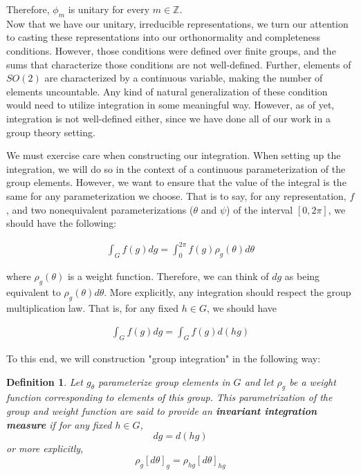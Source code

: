\documentclass[10pt]{ucthesis}
\newcommand{\Z}{\mathbb{Z}}
\newtheorem{definition}{Definition}[chapter]
\begin{document}
Therefore, $\phi_m$ is unitary for every $m\in\Z$. \\

Now that we have our unitary, irreducible representations, we turn our attention to casting these representations into our orthonormality and completeness conditions. However, those conditions were defined over finite groups, and the sums that characterize those conditions are not well-defined. Further, elements of $SO(2)$ are characterized by a continuous variable, making the number of elements uncountable. Any kind of natural generalization of these condition would need to utilize integration in some meaningful way. However, as of yet, integration is not well-defined either, since we have done all of our work in a group theory setting.

We must exercise care when constructing our integration. When setting up the integration, we will do so in the context of a continuous parameterization of the group elements. However, we want to ensure that the value of the integral is the same for any parameterization we choose. That is to say, for any representation, $f$, and two nonequivalent parameterizations ($\theta$ and $\psi$) of the interval $[0,2\pi]$, we should have the following:

\begin{equation}
	\begin{aligned}
		\int_G f(g) dg = \int_0^{2\pi}f(g)\rho_{g}(\theta)  d\theta
	\end{aligned}
\end{equation}

where $\rho_g(\theta)$ is a weight function. Therefore, we can think of $dg$ as being equivalent to $\rho_g(\theta)  d\theta$. More explicitly, any integration should respect the group multiplication law. That is, for any fixed $h\in G$, we should have

\begin{equation}
	\begin{aligned}
		\int_G f(g) dg = \int_G f(g) d(hg)
	\end{aligned}
\end{equation}

To this end, we will construction "group integration" in the following way:

\begin{definition}
	Let $g_\theta$ parameterize group elements in $G$ and let $\rho_{g}$ be a weight function corresponding to elements of this group. This parametrization of the group and weight function are said to provide an \textbf{invariant integration measure} if for any fixed $h\in G$, $$dg = d(hg)$$ or more explicitly, $$\rho_{g}[d\theta]_g = \rho_{hg}[d\theta]_{hg}$$
\end{definition}
\end{document}
